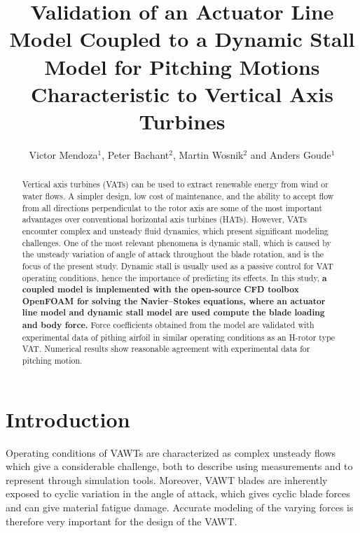 \documentclass[a4paper]{jpconf}
\begin{document}
\title{Validation of an Actuator Line Model Coupled to a Dynamic Stall Model for
Pitching Motions Characteristic to Vertical Axis Turbines}


\author{Victor Mendoza$^{1}$, Peter Bachant$^{2}$, Martin Wosnik$^{2}$ and Anders Goude$^{1}$ }
\address{$^{1}$ Department of Engineering Sciences, Division of Electricity, Uppsala University, \\Uppsala 751 21, Sweden}
\address{$^{2}$ Center for Ocean Renewable Energy, University of New Hampshire, 24 Colovos Rd.,\\ Durham, NH 03824, USA}


\begin{abstract}

    Vertical axis turbines (VATs) can be used to extract renewable energy from
    wind or water flows. A simpler design, low cost of maintenance, and the
    ability to accept flow from all directions perpendiculat to the rotor axis
    are some of the most important advantages over conventional horizontal axis
    turbines (HATs). However, VATs encounter complex and unsteady fluid
    dynamics, which present significant modeling challenges. One of the most
    relevant phenomena is dynamic stall, which is caused by the unsteady
    variation of angle of attack throughout the blade rotation, and is the focus
    of the present study. Dynamic stall is usually used as a passive control for
    VAT operating conditions, hence the importance of predicting its effects. In
    this study, \textbf{a coupled model is implemented with the open-source CFD
    toolbox OpenFOAM for solving the Navier--Stokes equations, where an actuator
    line model and dynamic stall model are used compute the blade loading and
    body force.} Force coefficients obtained from the model are validated with
    experimental data of pithing airfoil in similar operating conditions as an
    H-rotor type VAT. Numerical results show reasonable agreement with
    experimental data for pitching motion.

\end{abstract}


\section{Introduction}

Operating conditions of VAWTs are characterized as complex unsteady flows which
give a considerable challenge, both to describe using measurements and to
represent through simulation tools\cite{huyer1996unsteady}. Moreover, VAWT
blades are inherently exposed to cyclic variation in the angle of attack, which
gives cyclic blade forces and can give material fatigue damage. Accurate
modeling of the varying forces is therefore very important for the design of the
VAWT.
\end{document}
